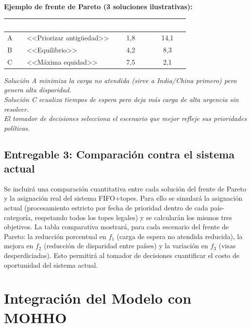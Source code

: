 \documentclass[12pt,letterpaper]{article}
\begin{document}
\begin{examplebox}
\textbf{Ejemplo de frente de Pareto (3 soluciones ilustrativas):}

\vspace{0.3em}
\begin{tabular}{llcc}
\toprule
\rowcolor{tablehead}
\textcolor{white}{\textbf{Sol.}} & \textcolor{white}{\textbf{Nombre del escenario}} & \textcolor{white}{\textbf{$f_1$ (años)}} & \textcolor{white}{\textbf{$f_2$ (años)}} \\
\midrule
A & <<Priorizar antigüedad>> & 1,8 & 14,1 \\
\rowcolor{gray!8}
B & <<Equilibrio>> & 4,2 & 8,3 \\
C & <<Máxima equidad>> & 7,5 & 2,1 \\
\bottomrule
\end{tabular}

\vspace{0.5em}
\textit{Solución A minimiza la carga no atendida (sirve a India/China primero) pero genera alta disparidad.\\
Solución C ecualiza tiempos de espera pero deja más carga de alta urgencia sin resolver.\\
El tomador de decisiones selecciona el escenario que mejor refleje sus prioridades políticas.}
\end{examplebox}

\subsection{Entregable 3: Comparación contra el sistema actual}

Se incluirá una comparación cuantitativa entre cada solución del frente de Pareto y la asignación real del sistema FIFO+topes. Para ello se simulará la asignación actual (procesamiento estricto por fecha de prioridad dentro de cada país-categoría, respetando todos los topes legales) y se calcularán los mismos tres objetivos. La tabla comparativa mostrará, para cada escenario del frente de Pareto: la reducción porcentual en $f_1$ (carga de espera no atendida reducida), la mejora en $f_2$ (reducción de disparidad entre países) y la variación en $f_3$ (visas desperdiciadas). Esto permitirá al tomador de decisiones cuantificar el costo de oportunidad del sistema actual.


\newpage
\section{Integración del Modelo con MOHHO}
\label{sec:integracion}
\end{document}
